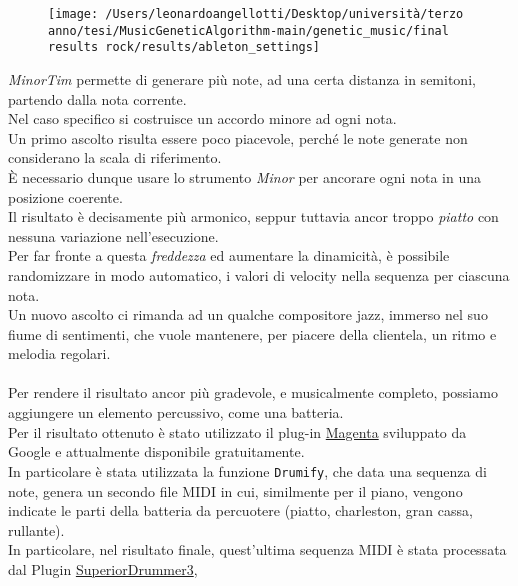 \documentclass[a4paper,12pt]{report}
\begin{document}
\begin{figure}[H]
    \centering
    \texttt{[image: /Users/leonardoangellotti/Desktop/università/terzo anno/tesi/MusicGeneticAlgorithm-main/genetic\_music/final results rock/results/ableton\_settings]} 
    \label{fig:immagine12}
\end{figure}

\textit{MinorTim} permette di generare più note, ad una certa distanza in semitoni, partendo dalla nota corrente. \\
Nel caso specifico si costruisce un accordo minore ad ogni nota. \\
Un primo ascolto risulta essere poco piacevole, perché le note generate non considerano la scala di riferimento. \\
È necessario dunque usare lo strumento \textit{Minor} per ancorare ogni nota in una posizione coerente. \\
Il risultato è decisamente più armonico, seppur tuttavia ancor troppo \textit{piatto} con nessuna variazione nell'esecuzione. \\
Per far fronte a questa \textit{freddezza} ed aumentare la dinamicità, è possibile randomizzare in modo automatico, i valori di velocity nella sequenza per ciascuna nota. \\
Un nuovo ascolto ci rimanda ad un qualche compositore jazz, immerso nel suo fiume di sentimenti,  che vuole mantenere, per piacere della clientela, un ritmo e melodia regolari. \\
\\
Per rendere il risultato ancor più gradevole, e musicalmente completo, possiamo aggiungere un elemento percussivo, come una batteria. \\
Per il risultato ottenuto è stato utilizzato il plug-in \href{https://magenta.tensorflow.org/studio}{Magenta}  sviluppato da Google e attualmente disponibile gratuitamente. \\
In particolare è stata utilizzata la funzione \texttt{Drumify}, che data una sequenza di note, genera un secondo file MIDI in cui, similmente per il piano, vengono indicate le parti della batteria da percuotere (piatto, charleston, gran cassa, rullante). \\
In particolare, nel risultato finale, quest'ultima sequenza MIDI è stata processata dal Plugin \href{https://www.toontrack.com/product/superior-drummer-3/?gad_source=1&gclid=Cj0KCQjws560BhCuARIsAHMqE0H2FsGI5sBj5JLtPNhhiKiLf9qMEccOntk8F9uc4_ZvSDPK5TCZZKUaAg1LEALw_wcB}{SuperiorDrummer3},
\end{document}
